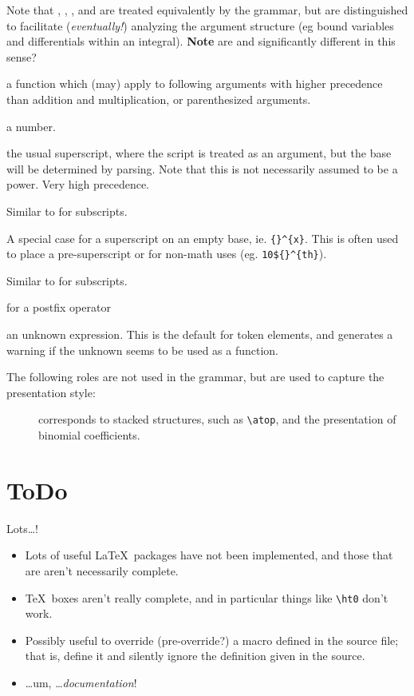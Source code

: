 \documentclass{report}
\begin{document}
\begin{description}
 Note that , , ,  and  are treated
 equivalently by the grammar, but are distinguished to facilitate (\emph{eventually!}) 
 analyzing the argument structure (eg bound variables and differentials within an integral).
 \textbf{Note} are  and  significantly different in this sense?
\item[\code{VERTBAR}]
\item[\code{FUNCTION}] a function which (may) apply to following arguments with higher
   precedence than addition and multiplication, or parenthesized arguments.
\item[\code{NUMBER}] a number.
\item[\code{POSTSUPERSCRIPT}] the usual superscript, where the script is treated as
  an argument, but the base will be determined by parsing. Note that this is not
  necessarily assumed to be a power. Very high precedence.
\item[\code{POSTSUBSCRIPT}] Similar to  for subscripts.
\item[\code{FLOATINGSUPERSCRIPT}] A special case for a superscript on an empty base,
  ie. \verb|{}^{x}|.  This is often used to place a pre-superscript or for
  non-math uses (eg. \verb|10${}^{th}|).
\item[\code{FLOATINGSUBSCRIPT}] Similar to  for subscripts.
\item[\code{POSTFIX}] for a postfix operator
\item[\code{UNKNOWN}] an unknown expression. This is the default for token elements,
  and generates a warning if the unknown seems to be used as a function.
\end{description}

The following roles are not used in the grammar, but are used to capture
the presentation style:
\begin{description}
\item[] corresponds to stacked structures, such as
  \verb|\atop|, and the presentation of binomial coefficients.
\end{description}

\chapter{ToDo}\label{todo}
Lots\ldots!
\begin{itemize}
\item Lots of useful \LaTeX\ packages have not been implemented, and those
  that are aren't necessarily complete.
\item \TeX\ boxes aren't really complete, and in particular things like \verb|\ht0|
  don't work.
\item Possibly useful to override (pre-override?) a macro defined in the source file;
  that is, define it and silently ignore the definition given in the source.
\item \ldots um, \ldots \emph{documentation}!
\end{itemize}
\end{document}
